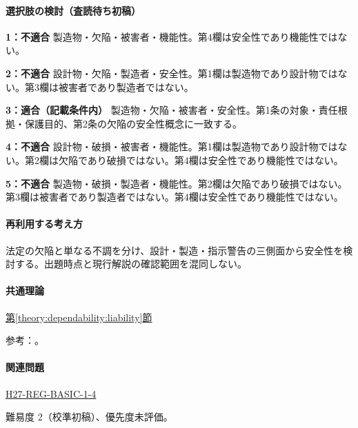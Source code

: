 \paragraph{選択肢の検討（査読待ち初稿）}\mbox{}\par

\noindent\textbf{1：不適合} 製造物・欠陥・被害者・機能性。第4欄は安全性であり機能性ではない。\par

\noindent\textbf{2：不適合} 設計物・欠陥・製造者・安全性。第1欄は製造物であり設計物ではない。第3欄は被害者であり製造者ではない。\par

\noindent\textbf{3：適合（記載条件内）} 製造物・欠陥・被害者・安全性。第1条の対象・責任根拠・保護目的、第2条の欠陥の安全性概念に一致する。\par

\noindent\textbf{4：不適合} 設計物・破損・被害者・機能性。第1欄は製造物であり設計物ではない。第2欄は欠陥であり破損ではない。第4欄は安全性であり機能性ではない。\par

\noindent\textbf{5：不適合} 製造物・破損・製造者・機能性。第2欄は欠陥であり破損ではない。第3欄は被害者であり製造者ではない。第4欄は安全性であり機能性ではない。\par

\paragraph{再利用する考え方} 法定の欠陥と単なる不調を分け、設計・製造・指示警告の三側面から安全性を検討する。出題時点と現行解説の確認範囲を混同しない。

\paragraph{共通理論} \hyperref[theory:dependability:liability]{第\ref*{theory:dependability:liability}節}

\par 参考：\cite{design_caa_pl1,design_caa_pl2}。

\paragraph{関連問題} \hyperref[q:h27-reg-basic-1-4]{H27-REG-BASIC-1-4}

\par 難易度 2（校準初稿）、優先度未評価。

